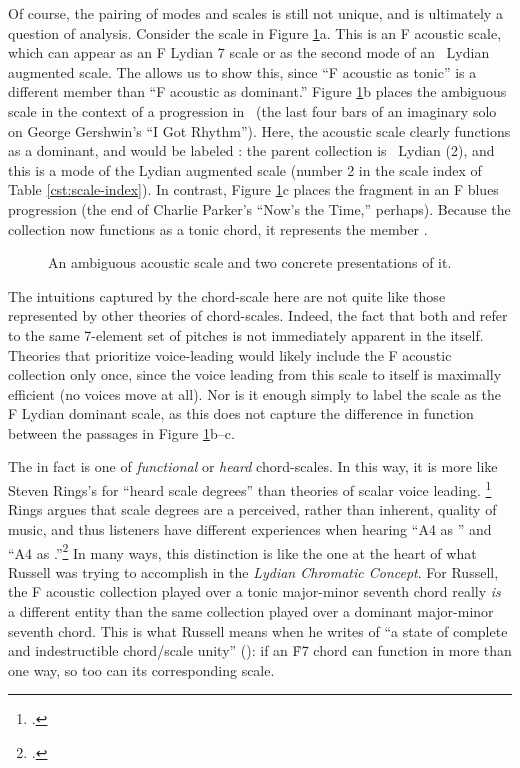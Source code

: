 Of course, the pairing of modes and scales is still not unique, and is
ultimately a question of analysis. Consider the scale in Figure
\ref{cst:ambiguous-acoustic}a. This is an F acoustic scale, which can appear
as an F Lydian \flat{}7 scale or as the second mode of an \Eflat\ Lydian
augmented scale. The \gis allows us to show this, since ``F
acoustic as tonic'' is a different \gis member than ``F acoustic as
dominant.'' Figure \ref{cst:ambiguous-acoustic}b places the ambiguous scale in
the context of a \tfo progression in \Bflat\ (the last four bars of an
imaginary solo on George Gershwin's ``I Got Rhythm''). Here, the acoustic
scale clearly functions as a dominant, and would be labeled
: the parent collection is \Eflat\ Lydian
(2\flat), and this is a mode of the Lydian augmented scale (number 2 in the
scale index of Table \ref{cst:scale-index}). In contrast, Figure
\ref{cst:ambiguous-acoustic}c places the fragment in an F blues \tfo
progression (the end of Charlie Parker's ``Now's the Time,'' perhaps). Because
the collection now functions as a tonic chord, it represents the \gis member
.

\begin{figure}[tbp]
  \caption{An ambiguous acoustic scale and two concrete presentations of it.}
  \label{cst:ambiguous-acoustic}
\end{figure}

The intuitions captured by the chord-scale \gis here are not quite like those
represented by other theories of chord-scales. Indeed, the fact that both
 and  refer to
the same 7-element set of pitches is not immediately apparent in the \gis itself.
Theories that prioritize voice-leading would likely include the F acoustic
collection only once, since the voice leading from this scale to itself is
maximally efficient (no voices move at all). Nor is it enough simply to label
the scale as the F Lydian dominant scale, as this does not capture the
difference in function between the passages in Figure
\ref{cst:ambiguous-acoustic}b--c.

The \gis in fact is one of \emph{functional} or \emph{heard} chord-scales. In
this way, it is more like Steven Rings's \gis for ``heard scale degrees'' than
theories of scalar voice leading. \footcite[44--50 and throughout]{rings:2011}
Rings argues that scale degrees are a perceived, rather than inherent, quality
of music, and thus listeners have different experiences when hearing ``A4 as
'' and ``A4 as .''\footcite[42]{rings:2011} In many ways, this
distinction is like the one at the heart of what Russell was trying to
accomplish in the \emph{Lydian Chromatic Concept}. For Russell, the F acoustic
collection played over a tonic major-minor seventh chord really \emph{is} a
different entity than the same collection played over a dominant major-minor
seventh chord. This is what Russell means when he writes of ``a state of
complete and indestructible chord/scale unity'' (): if an \h{F7} chord
can function in more than one way, so too can its corresponding scale.

